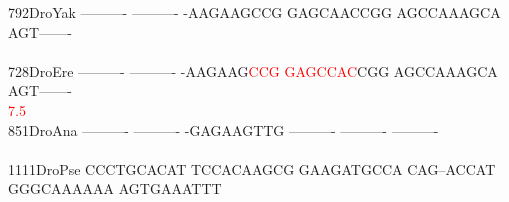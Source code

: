 \documentclass[11pt,twoside,reqno,a4paper]{article}
\begin{document}
{792\hspace*{2\charwidth}DroYak	----------	----------	-AAGAAGCCG	GAGCAACCGG	AGCCAAAGCA	AGT-------	\\
\hspace*{5\charwidth}\hspace*{7\charwidth}\hspace*{1\charwidth}\hspace*{1\charwidth}\hspace*{1\charwidth}\hspace*{1\charwidth}\hspace*{1\charwidth}\hspace*{1\charwidth}\\
728\hspace*{2\charwidth}DroEre	----------	----------	-AAGAAG\textcolor{Red}{C}\textcolor{Red}{C}\textcolor{Red}{G}	\textcolor{Red}{G}\textcolor{Red}{A}\textcolor{Red}{G}\textcolor{Red}{C}\textcolor{Red}{C}\textcolor{Red}{A}\textcolor{Red}{C}CGG	AGCCAAAGCA	AGT-------	\\
\hspace*{5\charwidth}\hspace*{7\charwidth}\hspace*{1\charwidth}\hspace*{1\charwidth}\hspace*{27\charwidth}\textcolor{Red}{7.5}\hspace*{1\charwidth}\hspace*{1\charwidth}\hspace*{1\charwidth}\hspace*{1\charwidth}\\
851\hspace*{2\charwidth}DroAna	----------	----------	-GAGAAGTTG	----------	----------	----------	\\
\hspace*{5\charwidth}\hspace*{7\charwidth}\hspace*{1\charwidth}\hspace*{1\charwidth}\hspace*{1\charwidth}\hspace*{1\charwidth}\hspace*{1\charwidth}\hspace*{1\charwidth}\\
1111\hspace*{1\charwidth}DroPse	CCCTGCACAT	TCCACAAGCG	GAAGATGCCA	CAG--ACCAT	GGGCAAAAAA	AGTGAAATTT	\\
\hspace*{5\charwidth}\hspace*{7\charwidth}\hspace*{1\charwidth}\hspace*{1\charwidth}\hspace*{1\charwidth}\hspace*{1\charwidth}\hspace*{1\charwidth}\hspace*{1\charwidth}\\
}
\end{document}
